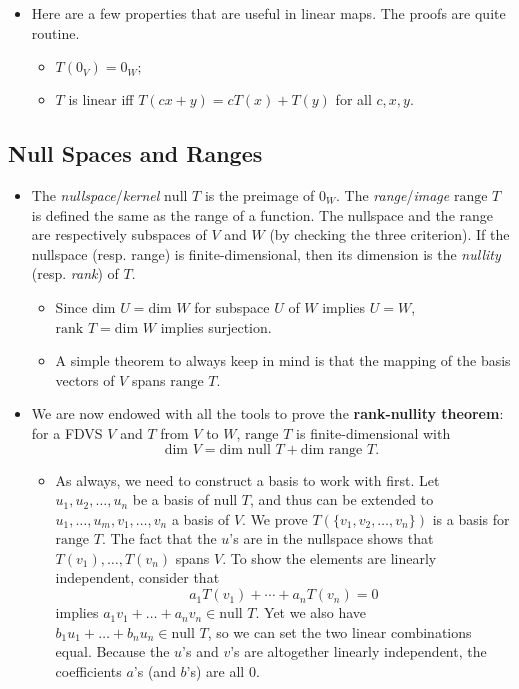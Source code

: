 \documentclass{article}
\newcommand{\n}{\text{null }}
\renewcommand{\r}{\text{range }}
\renewcommand{\d}{\text{dim }}
\begin{document}
\begin{itemize}
    \item Here are a few properties that are useful in linear maps. The proofs are quite routine.
    \begin{itemize}
        \item $T(0_V) = 0_W;$
        \item $T$ is linear iff $T(cx+y) = cT(x) + T(y)$ for all $c,x,y.$
    \end{itemize}
\end{itemize}

\subsection{Null Spaces and Ranges}
\begin{itemize}
    \item The \textit{nullspace}/\textit{kernel} $\n T$ is the preimage of $0_W$. The \textit{range}/\textit{image} $\r T$ is defined the same as the range of a function. The nullspace and the range are respectively subspaces of $V$ and $W$ (by checking the three criterion). If the nullspace (resp. range) is finite-dimensional, then its dimension is the \textit{nullity} (resp. \textit{rank}) of $T$.
    \begin{itemize}
        \item Since $\d U = \d W$ for subspace $U$ of $W$ implies $U = W$, $\text{rank }T = \d W$ implies surjection.
        \item A simple theorem to always keep in mind is that the mapping of the basis vectors of $V$ spans $\r T$.
    \end{itemize}
    \item We are now endowed with all the tools to prove the \textbf{rank-nullity theorem}: for a FDVS $V$ and $T$ from $V$ to $W$, $\r T$ is finite-dimensional with $$\d V = \d \n T + \d \r T.$$
    \begin{itemize}
        \item As always, we need to construct a basis to work with first. Let ${u_1, u_2, \dots, u_n}$ be a basis of $\n T$, and thus can be extended to ${u_1,\dots,u_m,v_1,\dots,v_n}$ a basis of $V$. We prove $T(\{v_1, v_2, \dots, v_n\})$ is a basis for $\r T$. The fact that the $u$'s are in the nullspace shows that $T(v_1), \dots,T(v_n)$ spans $V$. To show the elements are linearly independent, consider that $$a_1 T(v_1)+\cdots+a_n T(v_n) = 0$$ implies $a_1v_1+\dots+a_nv_n \in \n T$. Yet we also have $b_1u_1+\dots+b_nu_n \in \n T$, so we can set the two linear combinations equal. Because the $u$'s and $v$'s are altogether linearly independent, the coefficients $a$'s (and $b$'s) are all 0.

\end{itemize}
\end{itemize}
\end{document}
